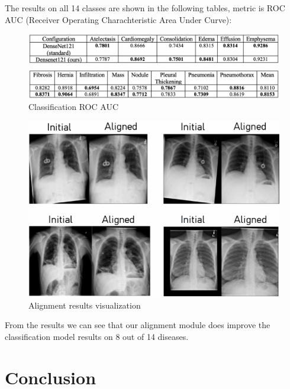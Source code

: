 \documentclass{article}
\begin{document}
The results on all 14 classes are shown in the following tables, metric is 
ROC AUC (Receiver Operating Charachteristic Area Under Curve):

\begin{figure}[ht]\label{classification}
    \vskip 0.2in
    \begin{center}
    \centerline{\includegraphics[width=\columnwidth * 2]{../images/classification.png}}
    \caption{Classification ROC AUC}
    \end{center}
    \vskip -0.2in
\end{figure}

\begin{figure}[ht]\label{visualization}
    \vskip 0.2in
    \begin{center}
    \centerline{\includegraphics[width=\columnwidth]{../images/alignment_results.png}}
    \caption{Alignment results visualization}
    \end{center}
    \vskip -0.2in
\end{figure}

From the results we can see that our alignment module does improve the classification 
 model results on 8 out of 14 diseases.

\section{Conclusion}\label{conclusion}
\end{document}
